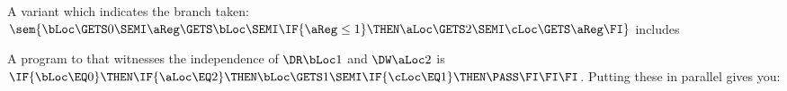A variant which indicates the branch taken:
$\sem{\bLoc\GETS0\SEMI\aReg\GETS\bLoc\SEMI\IF{\aReg\leq1}\THEN
  \aLoc\GETS2\SEMI\cLoc\GETS\aReg\FI}$
includes
\begin{tikzdisplay}[node distance=1em]
\end{tikzdisplay}
A program to that witnesses the independence of $\DR\bLoc1$ and $\DW\aLoc2$ is
\begin{math}
  \IF{\bLoc\EQ0}\THEN
    \IF{\aLoc\EQ2}\THEN
      \bLoc\GETS1\SEMI
      \IF{\cLoc\EQ1}\THEN\PASS\FI
    \FI
  \FI
\end{math}.
Putting these in parallel gives you:
\begin{tikzdisplay}[node distance=1em]
\end{tikzdisplay}

